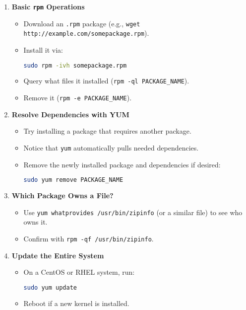 \documentclass[12pt,a4paper]{report}
\begin{document}
\begin{enumerate}
    \item \textbf{Basic \texttt{rpm} Operations}
    \begin{itemize}
        \item Download an \texttt{.rpm} package (e.g., \texttt{wget http://example.com/somepackage.rpm}).
        \item Install it via:
        \begin{lstlisting}[language=bash]
sudo rpm -ivh somepackage.rpm
        \end{lstlisting}
        \item Query what files it installed (\texttt{rpm -ql PACKAGE\_NAME}).
        \item Remove it (\texttt{rpm -e PACKAGE\_NAME}).
    \end{itemize}

    \item \textbf{Resolve Dependencies with YUM}
    \begin{itemize}
        \item Try installing a package that requires another package.
        \item Notice that \texttt{yum} automatically pulls needed dependencies.
        \item Remove the newly installed package and dependencies if desired:
        \begin{lstlisting}[language=bash]
sudo yum remove PACKAGE_NAME
        \end{lstlisting}
    \end{itemize}

    \item \textbf{Which Package Owns a File?}
    \begin{itemize}
        \item Use \texttt{yum whatprovides /usr/bin/zipinfo} (or a similar file) to see who owns it.
        \item Confirm with \texttt{rpm -qf /usr/bin/zipinfo}.
    \end{itemize}

    \item \textbf{Update the Entire System}
    \begin{itemize}
        \item On a CentOS or RHEL system, run:
        \begin{lstlisting}[language=bash]
sudo yum update
        \end{lstlisting}
        \item Reboot if a new kernel is installed.
    \end{itemize}


\end{enumerate}
\end{document}
